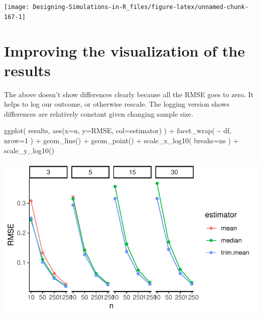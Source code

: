 \documentclass[
]{book}
\newenvironment{Shaded}{\begin{snugshade}}{\end{snugshade}}
\newcommand{\AttributeTok}[1]{\textcolor[rgb]{0.77,0.63,0.00}{#1}}
\newcommand{\DecValTok}[1]{\textcolor[rgb]{0.00,0.00,0.81}{#1}}
\newcommand{\FunctionTok}[1]{\textcolor[rgb]{0.00,0.00,0.00}{#1}}
\newcommand{\NormalTok}[1]{#1}
\newcommand{\SpecialCharTok}[1]{\textcolor[rgb]{0.00,0.00,0.00}{#1}}
\begin{document}
\begin{center}\texttt{[image: Designing-Simulations-in-R\_files/figure-latex/unnamed-chunk-167-1]} \end{center}

\hypertarget{improving-the-visualization-of-the-results}{%
\section{Improving the visualization of the results}\label{improving-the-visualization-of-the-results}}

The above doesn't show differences clearly because all the RMSE goes to zero.
It helps to log our outcome, or otherwise rescale. The logging version shows
differences are relatively constant given changing sample size.

\begin{Shaded}
\begin{Highlighting}[]
\FunctionTok{ggplot}\NormalTok{( results, }\FunctionTok{aes}\NormalTok{(}\AttributeTok{x=}\NormalTok{n, }\AttributeTok{y=}\NormalTok{RMSE, }\AttributeTok{col=}\NormalTok{estimator) ) }\SpecialCharTok{+}
    \FunctionTok{facet\_wrap}\NormalTok{( }\SpecialCharTok{\textasciitilde{}}\NormalTok{ df, }\AttributeTok{nrow=}\DecValTok{1}\NormalTok{ ) }\SpecialCharTok{+}
    \FunctionTok{geom\_line}\NormalTok{() }\SpecialCharTok{+} \FunctionTok{geom\_point}\NormalTok{() }\SpecialCharTok{+}
    \FunctionTok{scale\_x\_log10}\NormalTok{( }\AttributeTok{breaks=}\NormalTok{ns ) }\SpecialCharTok{+}
    \FunctionTok{scale\_y\_log10}\NormalTok{()}
\end{Highlighting}
\end{Shaded}

\begin{center}\includegraphics[width=0.75\linewidth]{Designing-Simulations-in-R_files/figure-latex/unnamed-chunk-168-1} \end{center}
\end{document}
